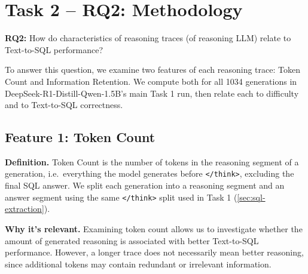 %
%

\section{Task 2 -- RQ2: Methodology}
\label{sec:rq2-methodology}

\textbf{RQ2:} How do characteristics of reasoning traces (of reasoning LLM) relate to Text-to-SQL performance?

To answer this question, we examine two features of each reasoning trace: Token Count and Information Retention. We compute both for all 1034 generations in DeepSeek-R1-Distill-Qwen-1.5B's main Task 1 run, then relate each to difficulty and to Text-to-SQL correctness.

\subsection{Feature 1: Token Count}
\label{sec:rq2-feature-tokencount}

\textbf{Definition.} Token Count is the number of tokens in the reasoning segment of a generation, i.e.\ everything the model generates before \texttt{</think>}, excluding the final SQL answer. We split each generation into a reasoning segment and an answer segment using the same \texttt{</think>} split used in Task 1 (\ref{sec:sql-extraction}).


\textbf{Why it's relevant.} Examining token count allows us to investigate whether the amount of generated reasoning is associated with better Text-to-SQL performance. However, a longer trace does not necessarily mean better reasoning, since additional tokens may contain redundant or irrelevant information.

